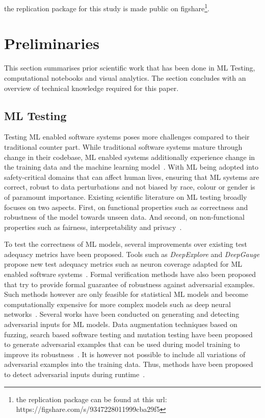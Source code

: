 the replication package for this study is made public on
figshare\footnote{the replication package can be found at this url:
https://figshare.com/s/9347228011999cba29f5}.

\section{Preliminaries}\label{sec:prelim}

This section summarises prior scientific work that has been done in ML
Testing, computational notebooks and visual analytics. The section
concludes with an overview of technical knowledge required for this
paper.

\subsection{ML Testing}\label{sec:ml-testing}

Testing ML enabled software systems poses more challenges compared to
their traditional counter part. While traditional software systems
mature through change in their codebase, ML enabled systems
additionally experience change in the training data and the machine
learning
model~\cite{sculley2015hidden,amershi2019software,sambasivan2021everyone}.
With ML being adopted into safety-critical domains that can affect
human lives, ensuring that ML systems are correct, robust to data
perturbations and not biased by race, colour or gender is of paramount
importance. Existing scientific literature on ML testing broadly
focuses on two aspects. First, on functional properties such as
correctness and robustness of the model towards unseen data. And
second, on non-functional properties such as fairness,
interpretability and
privacy~\cite{zhang2020machine,mehrabi2021survey,chen2022fairness}.

To test the correctness of ML models, several improvements over
existing test adequacy metrics have been proposed. Tools such as
\textit{DeepExplore} and \textit{DeepGauge} propose new test adequacy
metrics such as neuron coverage adapted for ML enabled software
systems~\cite{pei2017deepexplore, ma2018deepgauge,
  gerasimou2020importance}. Formal verification methods have also been
proposed that try to provide formal guarantee of robustness against
adversarial examples. Such methods however are only feasible for
statistical ML models and become computationally expensive for more
complex models such as deep neural networks~\cite{zhu2021deepmemory,
  baluta2021scalable}. Several works have been conducted on generating
and detecting adversarial inputs for ML models. Data augmentation
techniques based on fuzzing, search based software testing and
mutation testing have been proposed to generate adversarial examples
that can be used during model training to improve its
robustness~\cite{braiek2019deepevolution, gao2020fuzz, wang2021robot,
  zhang2020white}. It is however not possible to include all
variations of adversarial examples into the training data. Thus,
methods have been proposed to detect adversarial inputs during
runtime~\cite{xiao2021self, wang2020dissector, wang2019adversarial,
  berend2020cats}.

